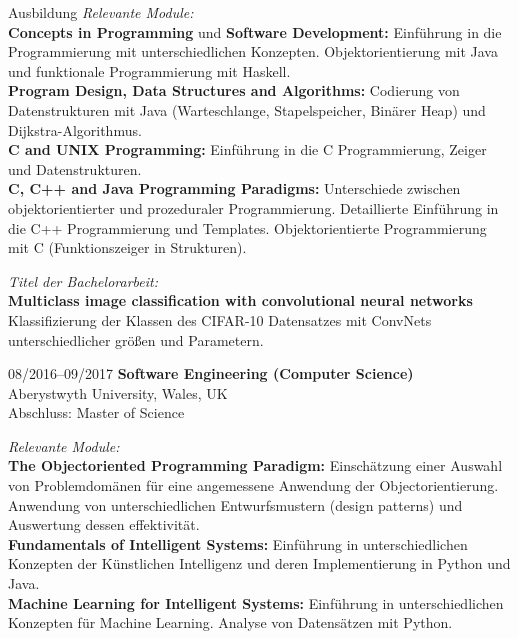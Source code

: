 \documentclass[12pt,a4paper,oneside,final]{scrartcl}
\begin{document}
\begin{cv}
\begin{cvlist}{Ausbildung}
            \textit{Relevante Module:}\\[0.5em]
            \textbf{Concepts in Programming} und \textbf{Software Development:} Einführung in die Programmierung mit unterschiedlichen Konzepten. Objektorientierung mit Java und funktionale Programmierung mit Haskell.\\[0.5em]
            \textbf{Program Design, Data Structures and Algorithms:} Codierung von Datenstrukturen mit Java (Warteschlange, Stapelspeicher, Binärer Heap) und Dijkstra-Algorithmus.\\[0.5em]
            \textbf{C and UNIX Programming:} Einführung in die C Programmierung, Zeiger und Datenstrukturen.\\[0.5em]
            \textbf{C, C++ and Java Programming Paradigms:} Unterschiede zwischen objektorientierter und prozeduraler Programmierung. Detaillierte Einführung in die C++ Programmierung und Templates. Objektorientierte Programmierung mit C (Funktionszeiger in Strukturen).

            \textit{Titel der Bachelorarbeit:}\\[0.5em]
            \textbf{Multiclass image classification with convolutional neural networks}\\
            Klassifizierung der Klassen des CIFAR-10 Datensatzes mit ConvNets unterschiedlicher größen und Parametern.

        \item[08/2016--09/2017] \textbf{Software Engineering (Computer Science)}\\
            Aberystwyth University, Wales, UK\\
            Abschluss: Master of Science

            \textit{Relevante Module:}\\[0.5em]
            \textbf{The Objectoriented Programming Paradigm:} Einschätzung einer Auswahl von Problemdomänen für eine angemessene Anwendung der Objectorientierung. Anwendung von unterschiedlichen Entwurfsmustern (design patterns) und Auswertung dessen effektivität.\\[0.5em]
            \textbf{Fundamentals of Intelligent Systems:} Einführung in unterschiedlichen Konzepten der Künstlichen Intelligenz und deren Implementierung in Python und Java.\\[0.5em]
            \textbf{Machine Learning for Intelligent Systems:} Einführung in unterschiedlichen Konzepten für Machine Learning. Analyse von Datensätzen mit Python.


\end{cvlist}
\end{cv}
\end{document}
